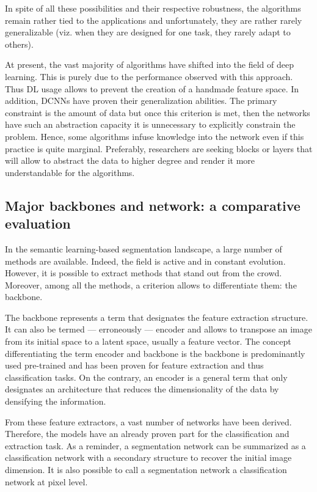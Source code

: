 In spite of all these possibilities and their respective robustness, the algorithms remain rather tied to the applications and unfortunately, they are rather rarely generalizable (viz. when they are designed for one task, they rarely adapt to others).


At present, the vast majority of algorithms have shifted into the field of deep learning. This is purely due to the performance observed with this approach. Thus DL usage allows to prevent the creation of a handmade feature space. In addition, DCNNs have proven their generalization abilities. The primary constraint is the amount of data but once this criterion is met, then the networks have such an abstraction capacity it is unnecessary to explicitly constrain the problem. Hence, some algorithms infuse knowledge into the network even if this practice is quite marginal. Preferably, researchers are seeking blocks or layers that will allow to abstract the data to higher degree and render it more understandable for the algorithms. 


\subsection{Major backbones and network: a comparative evaluation}\label{seg1}

In the semantic learning-based segmentation landscape, a large number of methods are available. Indeed, the field is active and in constant evolution. However, it is possible to extract methods that stand out from the crowd. Moreover, among all the methods, a criterion allows to differentiate them: the backbone.


The backbone represents a term that designates the feature extraction structure. It can also be termed — erroneously — encoder and allows to transpose an image from its initial space to a latent space, usually a feature vector. The concept differentiating the term encoder and backbone is the backbone is predominantly used pre-trained and has been proven for feature extraction and thus classification tasks. On the contrary, an encoder is a general term that only designates an architecture that reduces the dimensionality of the data by densifying the information.

From these feature extractors, a vast number of networks have been derived. Therefore, the models have an already proven part for the classification and extraction task. As a reminder, a segmentation network can be summarized as a classification network with a secondary structure to recover the initial image dimension. It is also possible to call a segmentation network a classification network at pixel level.


